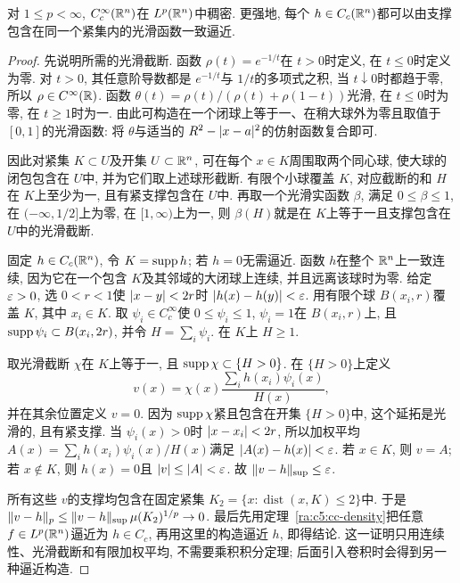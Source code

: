 \begin{proposition}\label{ra:c5:smooth-density}
对 $1\le p<\infty$, $C_c^\infty(\mathbb R^n)$在 $L^p(\mathbb R^n)$中稠密. 更强地, 每个 $h\in C_c(\mathbb R^n)$都可以由支撑包含在同一个紧集内的光滑函数一致逼近.
\end{proposition}
\begin{proof}
先说明所需的光滑截断. 函数 $\rho(t)=e^{-1/t}$在 $t>0$时定义, 在 $t\le0$时定义为零. 对 $t>0$, 其任意阶导数都是 $e^{-1/t}$与 $1/t$的多项式之积, 当 $t\downarrow0$时都趋于零, 所以 $\rho\in C^\infty(\mathbb R)$. 函数 $\theta(t)=\rho(t)/(\rho(t)+\rho(1-t))$光滑, 在 $t\le0$时为零, 在 $t\ge1$时为一. 由此可构造在一个闭球上等于一、在稍大球外为零且取值于 $[0,1]$的光滑函数: 将 $\theta$与适当的 $R^2-\lvert x-a\rvert^2$的仿射函数复合即可.

因此对紧集 $K\subset U$及开集 $U\subset\mathbb R^n$, 可在每个 $x\in K$周围取两个同心球, 使大球的闭包包含在 $U$中, 并为它们取上述球形截断. 有限个小球覆盖 $K$, 对应截断的和 $H$在 $K$上至少为一, 且有紧支撑包含在 $U$中. 再取一个光滑实函数 $\beta$, 满足 $0\le\beta\le1$, 在 $(-\infty,1/2]$上为零, 在 $[1,\infty)$上为一, 则 $\beta(H)$就是在 $K$上等于一且支撑包含在 $U$中的光滑截断.

固定 $h\in C_c(\mathbb R^n)$, 令 $K=\operatorname{supp} h$; 若 $h=0$无需逼近. 函数 $h$在整个 $\mathbb R^n$上一致连续, 因为它在一个包含 $K$及其邻域的大闭球上连续, 并且远离该球时为零. 给定 $\varepsilon>0$, 选 $0<r<1$使 $\lvert x-y\rvert<2r$时 $\lvert h(x)-h(y)\rvert<\varepsilon$. 用有限个球 $B(x_i,r)$覆盖 $K$, 其中 $x_i\in K$. 取 $\psi_i\in C_c^\infty$使 $0\le\psi_i\le1$, $\psi_i=1$在 $B(x_i,r)$上, 且 $\operatorname{supp}\psi_i\subset B(x_i,2r)$, 并令 $H=\sum_i\psi_i$. 在 $K$上 $H\ge1$.

取光滑截断 $\chi$在 $K$上等于一, 且 $\operatorname{supp}\chi\subset\{H>0\}$. 在 $\{H>0\}$上定义
\[
 v(x)=\chi(x)\frac{\sum_i h(x_i)\psi_i(x)}{H(x)},
\]
并在其余位置定义 $v=0$. 因为 $\operatorname{supp}\chi$紧且包含在开集 $\{H>0\}$中, 这个延拓是光滑的, 且有紧支撑. 当 $\psi_i(x)>0$时 $\lvert x-x_i\rvert<2r$, 所以加权平均 $A(x)=\sum_i h(x_i)\psi_i(x)/H(x)$满足 $\lvert A(x)-h(x)\rvert<\varepsilon$. 若 $x\in K$, 则 $v=A$; 若 $x\notin K$, 则 $h(x)=0$且 $\lvert v\rvert\le\lvert A\rvert<\varepsilon$. 故 $\lVert v-h\rVert_{\mathrm{sup}}\le\varepsilon$.

所有这些 $v$的支撑均包含在固定紧集 $K_2=\{x:\operatorname{dist}(x,K)\le2\}$中. 于是 $\lVert v-h\rVert_p\le\lVert v-h\rVert_{\mathrm{sup}}\,\mu(K_2)^{1/p}\to0$. 最后先用定理~\ref{ra:c5:cc-density}把任意 $f\in L^p(\mathbb R^n)$逼近为 $h\in C_c$, 再用这里的构造逼近 $h$, 即得结论. 这一证明只用连续性、光滑截断和有限加权平均, 不需要乘积积分定理; 后面引入卷积时会得到另一种逼近构造.
\end{proof}

